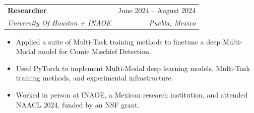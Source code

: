 \documentclass[letterpaper,10.8pt]{article}
\makeatletter
\newcommand{\resumeItem}[1]{
  \item\small{
    {#1 \vspace{-2pt}}
  }
}
\newcommand{\resumeSubheading}[4]{
  \vspace{-2pt}\item
    \begin{tabular*}{0.97\textwidth}[t]{l@{\extracolsep{\fill}}r}
      \textbf{#1} & #2 \\
      \textit{\small#3} & \textit{\small #4} \\
    \end{tabular*}\vspace{-7pt}
}
\newcommand{\resumeSubSubheading}[2]{
    \item
    \begin{tabular*}{0.97\textwidth}{l@{\extracolsep{\fill}}r}
      \textit{\small#1} & \textit{\small #2} \\
    \end{tabular*}\vspace{-7pt}
}
\newcommand{\resumeSubHeadingListEnd}{\end{itemize}}
\newcommand{\resumeItemListStart}{\begin{itemize}}
\newcommand{\resumeItemListEnd}{\end{itemize}\vspace{-5pt}}
\makeatother
\begin{document}
     \resumeSubheading
      {Researcher}{June 2024 -- August 2024}
      {University Of Houston + INAOE}{Puebla, Mexico}
      \resumeItemListStart
        \resumeItem{Applied a suite of Multi-Task training methods to finetune a deep Multi-Modal model for Comic Mischief Detection.}
        \resumeItem{Used PyTorch to implement Multi-Modal deep learning models, Multi-Task training methods, and experimental infrastructure.}
        \resumeItem{Worked in person at INAOE, a Mexican research institution, and attended NAACL 2024, funded by an NSF grant.}
      \resumeItemListEnd
      
      


      
\end{document}
